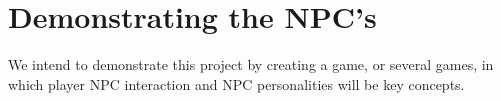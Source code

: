 \documentclass{article}
\begin{document}
	\newpage
	\section{Demonstrating the NPC's}
	 We intend to demonstrate this project by creating a game, or several games, in which player NPC interaction and NPC personalities will be key concepts. 

\end{document}
